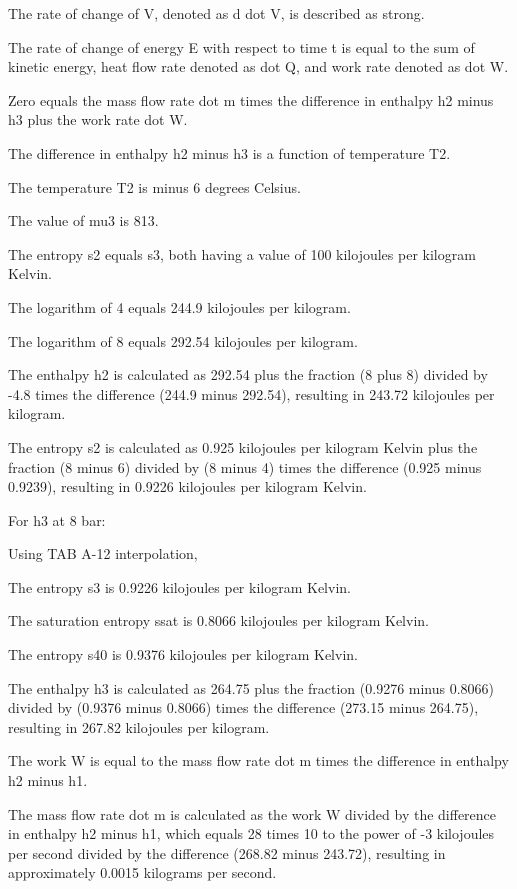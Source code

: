 The rate of change of V, denoted as d dot V, is described as strong.

The rate of change of energy E with respect to time t is equal to the sum of kinetic energy, heat flow rate denoted as dot Q, and work rate denoted as dot W.

Zero equals the mass flow rate dot m times the difference in enthalpy h2 minus h3 plus the work rate dot W.

The difference in enthalpy h2 minus h3 is a function of temperature T2.

The temperature T2 is minus 6 degrees Celsius.

The value of mu3 is 813.

The entropy s2 equals s3, both having a value of 100 kilojoules per kilogram Kelvin.

The logarithm of 4 equals 244.9 kilojoules per kilogram.

The logarithm of 8 equals 292.54 kilojoules per kilogram.

The enthalpy h2 is calculated as 292.54 plus the fraction (8 plus 8) divided by -4.8 times the difference (244.9 minus 292.54), resulting in 243.72 kilojoules per kilogram.

The entropy s2 is calculated as 0.925 kilojoules per kilogram Kelvin plus the fraction (8 minus 6) divided by (8 minus 4) times the difference (0.925 minus 0.9239), resulting in 0.9226 kilojoules per kilogram Kelvin.

For h3 at 8 bar:

Using TAB A-12 interpolation,

The entropy s3 is 0.9226 kilojoules per kilogram Kelvin.

The saturation entropy ssat is 0.8066 kilojoules per kilogram Kelvin.

The entropy s40 is 0.9376 kilojoules per kilogram Kelvin.

The enthalpy h3 is calculated as 264.75 plus the fraction (0.9276 minus 0.8066) divided by (0.9376 minus 0.8066) times the difference (273.15 minus 264.75), resulting in 267.82 kilojoules per kilogram.

The work W is equal to the mass flow rate dot m times the difference in enthalpy h2 minus h1.

The mass flow rate dot m is calculated as the work W divided by the difference in enthalpy h2 minus h1, which equals 28 times 10 to the power of -3 kilojoules per second divided by the difference (268.82 minus 243.72), resulting in approximately 0.0015 kilograms per second.